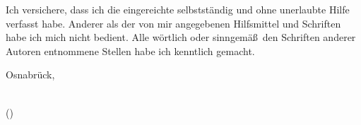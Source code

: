 \makeatletter
  \hspace{1cm}\vfill{}
	\thispagestyle{empty}

	Ich versichere, dass ich die eingereichte \ThesisType{}
  selbstst\"andig und ohne unerlaubte Hilfe verfasst habe.
  Anderer als der von mir angegebenen Hilfsmittel und Schriften habe ich mich nicht bedient.
  Alle w\"ortlich oder sinngem\"a\ss\ den Schriften anderer Autoren entnommene
  Stellen habe ich kenntlich gemacht.

  \vspace{1cm}

	\begin{flushright}
		Osnabr\"uck, \@date
	\end{flushright}

	\protect{\vspace{0.5cm}}
	\underline{\hspace{7cm}}\\
	(\@author)
\makeatother